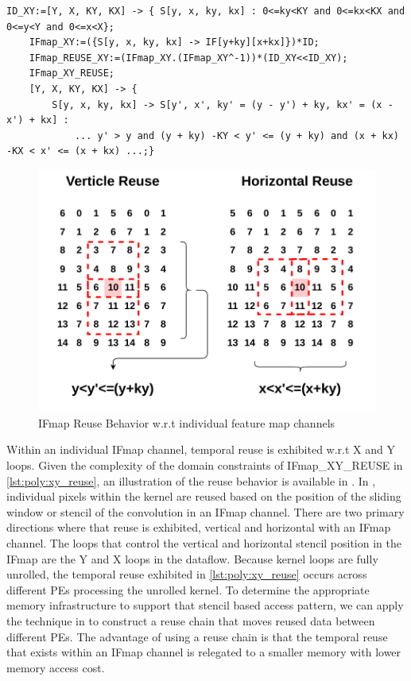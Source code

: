 \begin{lstlisting}[caption=Analysis of IFmap channel reuse, label={lst:poly:xy_reuse}]
    ID_XY:=[Y, X, KY, KX] -> { S[y, x, ky, kx] : 0<=ky<KY and 0<=kx<KX and 0<=y<Y and 0<=x<X};
    IFmap_XY:=({S[y, x, ky, kx] -> IF[y+ky][x+kx]})*ID;
    IFmap_REUSE_XY:=(IFmap_XY.(IFmap_XY^-1))*(ID_XY<<ID_XY);
    IFmap_XY_REUSE;
    [Y, X, KY, KX] -> { 
        S[y, x, ky, kx] -> S[y', x', ky' = (y - y') + ky, kx' = (x - x') + kx] : 
            ... y' > y and (y + ky) -KY < y' <= (y + ky) and (x + kx) -KX < x' <= (x + kx) ...;}
\end{lstlisting}

\begin{figure}[]
    \centering
    \includegraphics[scale=0.8]{fig/xy_reuse.pdf}
    \caption{IFmap Reuse Behavior w.r.t individual feature map channels}
    \label{fig:IFmap_xy_reuse}
\end{figure}

Within an individual IFmap channel, temporal reuse is exhibited w.r.t X and Y
loops. Given the complexity of the domain constraints of IFmap\_XY\_REUSE in
\autoref{lst:poly:xy_reuse}, an illustration of the reuse behavior is available
in . In , individual
pixels within the kernel are reused based on the position of the sliding window
or stencil of the convolution in an IFmap channel. There are two primary
directions where that reuse is exhibited, vertical and horizontal with an IFmap
channel. The loops that control the vertical and horizontal stencil position in
the IFmap are the Y and X loops in the dataflow. Because kernel loops are fully
unrolled, the temporal reuse exhibited in \autoref{lst:poly:xy_reuse} occurs
across different PEs processing the unrolled kernel. To determine the appropriate memory
infrastructure to support that stencil based access pattern, we can apply the
technique in \cite{meeus} to construct a reuse chain that moves reused data
between different PEs. The advantage of using a reuse chain is that the
temporal reuse that exists within an IFmap channel is relegated to a smaller
memory with lower memory access cost.

